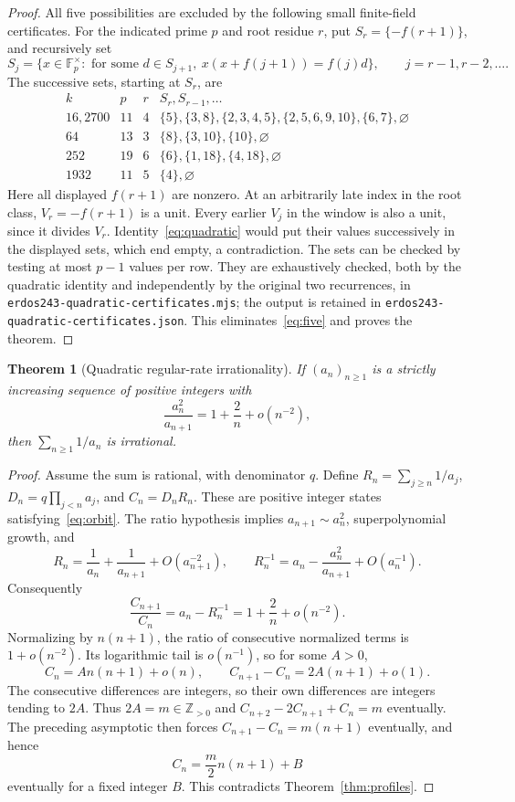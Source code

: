 \documentclass[11pt]{article}
\newtheorem{theorem}{Theorem}
\newcommand{\Z}{\mathbb Z}
\newcommand{\Fp}{\mathbb F_p}
\begin{document}
\begin{proof}
All five possibilities are excluded by the following small finite-field
certificates. For the indicated prime $p$ and root residue $r$, put
$S_r=\{-f(r+1)\}$, and recursively set
\[
 S_j=\{x\in\Fp^\times:\text{ for some }d\in S_{j+1},\ 
                 x(x+f(j+1))=f(j)d\},\qquad j=r-1,r-2,\ldots .
\]
The successive sets, starting at $S_r$, are
\[
\begin{array}{c|c|c|l}
 k&p&r& S_r,S_{r-1},\ldots\\\hline
 16,2700&11&4&
 \{5\},\{3,8\},\{2,3,4,5\},\{2,5,6,9,10\},\{6,7\},\varnothing\\
 64&13&3&\{8\},\{3,10\},\{10\},\varnothing\\
 252&19&6&\{6\},\{1,18\},\{4,18\},\varnothing\\
 1932&11&5&\{4\},\varnothing
\end{array}
\]
Here all displayed $f(r+1)$ are nonzero. At an arbitrarily late index
in the root class, $V_r=-f(r+1)$ is a unit. Every earlier $V_j$ in
the window is also a unit, since it divides $V_r$. Identity~\eqref{eq:quadratic}
would put their values successively in the displayed sets, which end
empty, a contradiction. The sets can be checked by testing at most
$p-1$ values per row. They are exhaustively checked, both by the
quadratic identity and independently by the original two recurrences,
in \texttt{erdos243-quadratic-certificates.mjs}; the output is retained
in \texttt{erdos243-quadratic-certificates.json}.
This eliminates~\eqref{eq:five} and proves the theorem.
\end{proof}

\begin{theorem}[Quadratic regular-rate irrationality]\label{thm:rate}
If $(a_n)_{n\ge1}$ is a strictly increasing sequence of positive
integers with
\[
 \frac{a_n^2}{a_{n+1}}=1+\frac2n+o(n^{-2}),
\]
then $\sum_{n\ge1}1/a_n$ is irrational.
\end{theorem}
\begin{proof}
Assume the sum is rational, with denominator $q$. Define
$R_n=\sum_{j\ge n}1/a_j$, $D_n=q\prod_{j<n}a_j$, and $C_n=D_nR_n$.
These are positive integer states satisfying~\eqref{eq:orbit}.
The ratio hypothesis implies $a_{n+1}\sim a_n^2$, superpolynomial
growth, and
\[
 R_n=\frac1{a_n}+\frac1{a_{n+1}}+O(a_{n+1}^{-2}),\qquad
 R_n^{-1}=a_n-\frac{a_n^2}{a_{n+1}}+O(a_n^{-1}).
\]
Consequently
\[
 \frac{C_{n+1}}{C_n}=a_n-R_n^{-1}
 =1+\frac2n+o(n^{-2}).
\]
Normalizing by $n(n+1)$, the ratio of consecutive normalized terms is
$1+o(n^{-2})$. Its logarithmic tail is $o(n^{-1})$, so for some
$A>0$,
\[
 C_n=A n(n+1)+o(n),\qquad
 C_{n+1}-C_n=2A(n+1)+o(1).
\]
The consecutive differences are integers, so their own differences
are integers tending to $2A$. Thus $2A=m\in\Z_{>0}$ and
$C_{n+2}-2C_{n+1}+C_n=m$ eventually. The preceding asymptotic then
forces $C_{n+1}-C_n=m(n+1)$ eventually, and hence
\[
 C_n=\frac m2 n(n+1)+B
\]
eventually for a fixed integer $B$. This contradicts
Theorem~\ref{thm:profiles}.
\end{proof}
\end{document}
